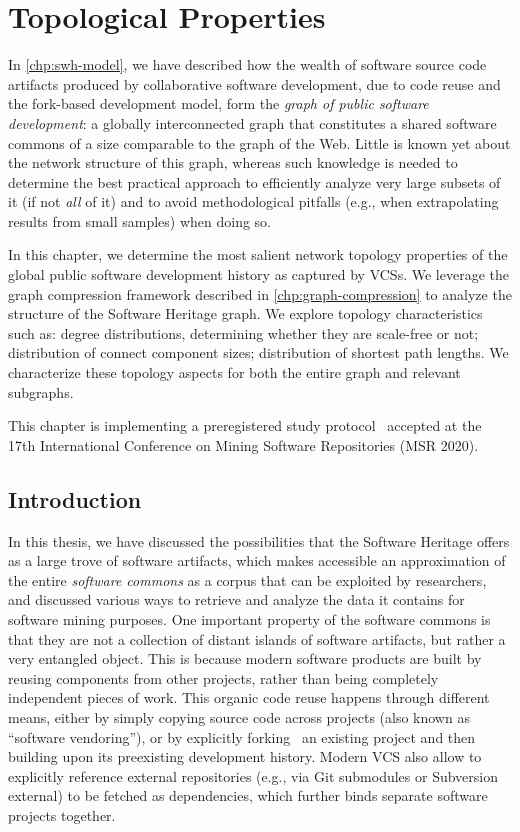 \chapter{Topological Properties}%
\label{chp:topology}

In \cref{chp:swh-model}, we have described how the wealth of software source
code artifacts produced by collaborative software development, due to code
reuse and the fork-based development model, form the \emph{graph of public
software development}: a globally interconnected graph that constitutes a
shared software commons of a size comparable to the graph of the Web.
Little is known yet about the network structure of this graph, whereas such
knowledge is needed to determine the best practical approach to efficiently
analyze very large subsets of it (if not \emph{all} of it) and to avoid
methodological pitfalls (e.g., when extrapolating results from small samples)
when doing so.

In this chapter, we determine the most salient network topology properties of
the global public software development history as captured by \glspl{VCS}. We
leverage the graph compression framework described in
\cref{chp:graph-compression} to analyze the structure of the Software Heritage
graph.
We explore topology characteristics such as: degree distributions,
determining whether they are scale-free or not; distribution of connect
component sizes; distribution of shortest path lengths. We characterize these
topology aspects for both the entire graph and relevant subgraphs.

This chapter is implementing a preregistered study
protocol~\cite{msr-2020-topology} accepted at the 17th International Conference
on Mining Software Repositories (MSR 2020).

\section{Introduction}

In this thesis, we have discussed the possibilities that the Software Heritage
offers as a large trove of software artifacts, which makes accessible an
approximation of the entire \emph{software commons} as a corpus that can be
exploited by researchers, and discussed various ways to retrieve and analyze
the data it contains for software mining purposes.
One important property of the software commons is that they are not a
collection of distant islands of software artifacts, but rather a very
entangled object. This is because modern software products are built by reusing
components from other projects, rather than being completely independent pieces
of work. This organic code reuse happens through different means, either by
simply copying source code across projects (also known as ``software
vendoring''), or by explicitly forking~\cite{robles2012forks,
swh-msr2020-forking} an existing project and then building upon its preexisting
development history. Modern VCS also allow to explicitly reference external
repositories (e.g., via Git submodules or Subversion external) to be fetched as
dependencies, which further binds separate software projects together.

